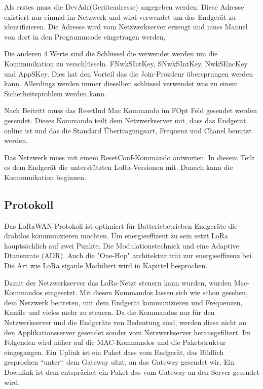 \documentclass[a4paper,12pt]{article}
\begin{document}
                Als erstes muss die DevAdr(Geräteadresse) angegeben werden. Diese Adresse existiert nur einmal im 
                Netzwerk und wird verwendet um das Endgerät zu identifizieren. Die Adresse wird vom Netzwerkserver 
                erzeugt und muss Manuel von dort in den Programmcode eingetragen werden,

                Die anderen 4 Werte sind die Schlüssel die verwendet werden um die Kommunikation zu verschlüsseln. 
                FNwkSIntKey, SNwkSIntKey, NwkSEncKey und AppSKey. Dies hat den Vorteil das die Join-Prozdeur 
                übersprungen werden kann. Allerdings werden immer dieselben schlüssel verwendet was zu einem 
                Sicherheitsproblem werden kann.

                Nach Beitritt muss das ResetInd Mac Kommando im FOpt Feld gesendet werden gesendet. Dieses Kommando 
                teilt dem Netzwerkserver mit, dass das Endgerät online ist und das die Standard Übertragungsart, 
                Frequenz und Chanel benutzt werden.

                Das Netzwerk muss  mit einem ResetConf-Kommando antworten. In diesem Teilt es dem Endgerät die
                unterstützten LoRa-Versionen mit. Danach kann die Kommunikation beginnen.
        \subsection{Protokoll} \label{sec:protokoll}
            Das LoRaWAN Protokoll ist optimiert für Batteriebetrieben Endgeräte die drahtlos kommunizieren möchten. 
            Um energieeffizent zu sein setzt LoRa hauptsächlich auf zwei Punkte. Die Modulationstechnick und eine 
            Adaptive Dtanenrate (ADR). Auch die 
            "One-Hop" architektur trät zur energieeffizenz bei. Die Art wie LoRa siganle Moduliert wird in Kapittel 
             besprochen. \cite[S,1 f]{LoraClasses}


            Damit der Netzwerkserver das LoRa-Netzt steuern kann wurden, wurden Mac-Kommandos eingesetzt. Mit diesen 
            Kommandos lassen sich wie schon gesehen, dem Netzwerk beitreten, mit dem Endgerät kommunizieren und 
            Frequenzen, Kanäle und vieles mehr zu steuern.
            Da die Kommandos nur für den Netzwerkserver und die Endgeräte von Bedeutung sind, werden diese nicht an 
            den Applikationsserver gesendet sonder vom Netzwerkserver herausgefiltert. Im Folgenden wird näher auf 
            die MAC-Kommandos und die Paketstruktur eingegangen.
            Ein Uplink ist ein Paket dass vom Endgerät, das Bildlich gesprochen ``unter‘‘ dem Gateway sitzt, an das 
            Gateway gesendet wir. Ein Downlink ist dem entsprächet ein Paket das vom Gateway an den Server gesendet 
            wird.
\end{document}
